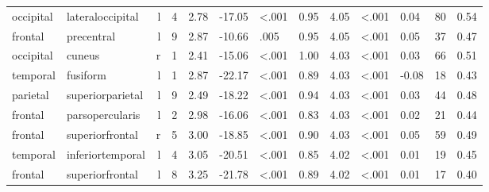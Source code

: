\documentclass{article}
\begin{document}
\begin{longtable}{llrR{1.3cm}R{1cm}R{1.3cm}R{1cm}R{1cm}R{1.3cm}R{1cm}R{1.8cm}R{1.3cm}R{1.8cm}}
 occipital &          lateraloccipital &    l &         4 &                  2.78 &           -17.05 &      \textless.001 &                               0.95 &                          4.05 &                   \textless.001 &   0.04 &     80 &      0.54 \\
   frontal &                precentral &    l &         9 &                  2.87 &           -10.66 &               .005 &                               0.95 &                          4.05 &                   \textless.001 &   0.05 &     37 &      0.47 \\
 occipital &                    cuneus &    r &         1 &                  2.41 &           -15.06 &      \textless.001 &                               1.00 &                          4.03 &                   \textless.001 &   0.03 &     66 &      0.51 \\
  temporal &                  fusiform &    l &         1 &                  2.87 &           -22.17 &      \textless.001 &                               0.89 &                          4.03 &                   \textless.001 &  -0.08 &     18 &      0.43 \\
  parietal &          superiorparietal &    l &         9 &                  2.49 &           -18.22 &      \textless.001 &                               0.94 &                          4.03 &                   \textless.001 &   0.03 &     44 &      0.48 \\
   frontal &           parsopercularis &    l &         2 &                  2.98 &           -16.06 &      \textless.001 &                               0.83 &                          4.03 &                   \textless.001 &   0.02 &     21 &      0.44 \\
   frontal &           superiorfrontal &    r &         5 &                  3.00 &           -18.85 &      \textless.001 &                               0.90 &                          4.03 &                   \textless.001 &   0.05 &     59 &      0.49 \\
  temporal &          inferiortemporal &    l &         4 &                  3.05 &           -20.51 &      \textless.001 &                               0.85 &                          4.02 &                   \textless.001 &   0.01 &     19 &      0.45 \\
   frontal &           superiorfrontal &    l &         8 &                  3.25 &           -21.78 &      \textless.001 &                               0.89 &                          4.02 &                   \textless.001 &   0.01 &     17 &      0.40 \\

\end{longtable}
\end{document}
